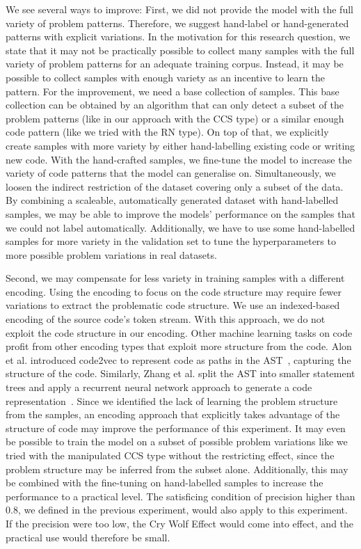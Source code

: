We see several ways to improve:
First, we did not provide the model with the full variety of problem patterns. Therefore, we suggest hand-label or hand-generated patterns with explicit variations.
In the motivation for this research question, we state that it may not be practically possible to collect many samples with the full variety of problem patterns for an adequate training corpus. Instead, it may be possible to collect samples with enough variety as an incentive to learn the pattern. For the improvement, we need a base collection of samples. This base collection can be obtained by an algorithm that can only detect a subset of the problem patterns (like in our approach with the CCS type) or a similar enough code pattern (like we tried with the RN type). On top of that, we explicitly create samples with more variety by either hand-labelling existing code or writing new code. With the hand-crafted samples, we fine-tune the model to increase the variety of code patterns that the model can generalise on. Simultaneously, we loosen the indirect restriction of the dataset covering only a subset of the data. By combining a scaleable, automatically generated dataset with hand-labelled samples, we may be able to improve the models' performance on the samples that we could not label automatically. Additionally, we have to use some hand-labelled samples for more variety in the validation set to tune the hyperparameters to more possible problem variations in real datasets.

Second, we may compensate for less variety in training samples with a different encoding. Using the encoding to focus on the code structure may require fewer variations to extract the problematic code structure. We use an indexed-based encoding of the source code's token stream. With this approach, we do not exploit the code structure in our encoding. Other machine learning tasks on code profit from other encoding types that exploit more structure from the code. Alon et al. introduced code2vec to represent code as paths in the AST~\cite{alon_code2vec_2018}, capturing the structure of the code. Similarly, Zhang et al. split the AST into smaller statement trees and apply a recurrent neural network approach to generate a code representation~\cite{zhang_novel_2019}.
Since we identified the lack of learning the problem structure from the samples, an encoding approach that explicitly takes advantage of the structure of code may improve the performance of this experiment. It may even be possible to train the model on a subset of possible problem variations like we tried with the manipulated CCS type without the restricting effect, since the problem structure may be inferred from the subset alone.
Additionally, this may be combined with the fine-tuning on hand-labelled samples to increase the performance to a practical level. The satisficing condition of precision higher than 0.8, we defined in the previous experiment, would also apply to this experiment. 
If the precision were too low, the Cry Wolf Effect would come into effect, and the practical use would therefore be small.


